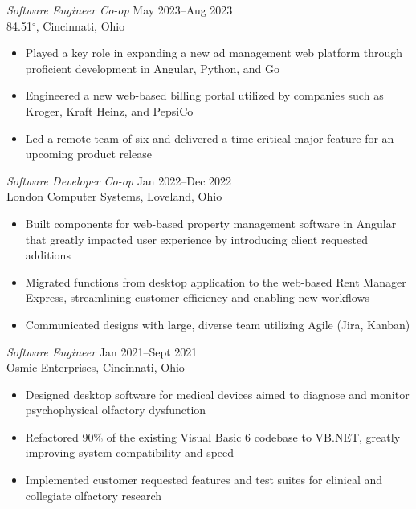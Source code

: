 \documentclass[margin]{res} %
\begin{document}
\begin{resume}
{\sl Software Engineer Co-op\/} \hfill {\color{black} May 2023--Aug 2023}  \\
84.51$^{\circ}$, Cincinnati, Ohio 
\vspace{1mm}
\begin{itemize}  %
\item Played a key role in expanding a new ad management web platform through proficient development in Angular, Python, and Go
\item Engineered a new web-based billing portal utilized by companies such as Kroger, Kraft Heinz, and PepsiCo
\item Led a remote team of six and delivered a time-critical major feature for an upcoming product release
\end{itemize}


{\sl Software Developer Co-op\/} \hfill {\color{black} Jan 2022--Dec 2022}  \\
London Computer Systems, Loveland, Ohio 
\vspace{1mm}
\begin{itemize}  %
\item Built components for web-based property management software in Angular that greatly impacted user experience by introducing client requested additions
\item Migrated functions from desktop application to the web-based Rent Manager Express, streamlining customer efficiency and enabling new workflows
\item Communicated designs with large, diverse team utilizing Agile (Jira, Kanban)
\end{itemize}


{\sl Software Engineer\/} \hfill {\color{black} Jan 2021--Sept 2021}  \\
Osmic Enterprises, Cincinnati, Ohio
\vspace{1mm}
\begin{itemize} %
\item Designed desktop software for medical devices aimed to diagnose and monitor psychophysical olfactory dysfunction
\item Refactored 90\% of the existing Visual Basic 6 codebase to VB.NET, greatly improving system compatibility and speed   
\item Implemented customer requested features and test suites for clinical and collegiate olfactory research
\end{itemize}


\end{resume}
\end{document}
